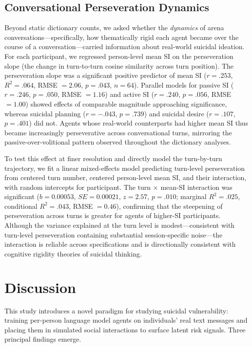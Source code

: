 \documentclass[review,12pt,authoryear]{elsarticle}
\begin{document}
\subsection{Conversational Perseveration Dynamics}

Beyond static dictionary counts, we asked whether the \textit{dynamics} of arena conversations---specifically, how thematically rigid each agent became over the course of a conversation---carried information about real-world suicidal ideation. For each participant, we regressed person-level mean SI on the perseveration slope (the change in turn-to-turn cosine similarity across turn position). The perseveration slope was a significant positive predictor of mean SI ($r = .253$, $R^2 = .064$, RMSE $= 2.06$, $p = .043$, $n = 64$). Parallel models for passive SI ($r = .246$, $p = .050$, RMSE $= 1.16$) and active SI ($r = .240$, $p = .056$, RMSE $= 1.00$) showed effects of comparable magnitude approaching significance, whereas suicidal planning ($r = -.043$, $p = .739$) and suicidal desire ($r = .107$, $p = .401$) did not. Agents whose real-world counterparts had higher mean SI thus became increasingly perseverative across conversational turns, mirroring the passive-over-volitional pattern observed throughout the dictionary analyses.

To test this effect at finer resolution and directly model the turn-by-turn trajectory, we fit a linear mixed-effects model predicting turn-level perseveration from centered turn number, centered person-level mean SI, and their interaction, with random intercepts for participant. The turn $\times$ mean-SI interaction was significant ($b = 0.00053$, $SE = 0.00021$, $z = 2.57$, $p = .010$; marginal $R^2 = .025$, conditional $R^2 = .043$, RMSE $= 0.46$), confirming that the steepening of perseveration across turns is greater for agents of higher-SI participants. Although the variance explained at the turn level is modest---consistent with turn-level perseveration containing substantial session-specific noise---the interaction is reliable across specifications and is directionally consistent with cognitive rigidity theories of suicidal thinking.

\section{Discussion}

This study introduces a novel paradigm for studying suicidal vulnerability: training per-person language model agents on individuals' real text messages and placing them in simulated social interactions to surface latent risk signals. Three principal findings emerge.
\end{document}
